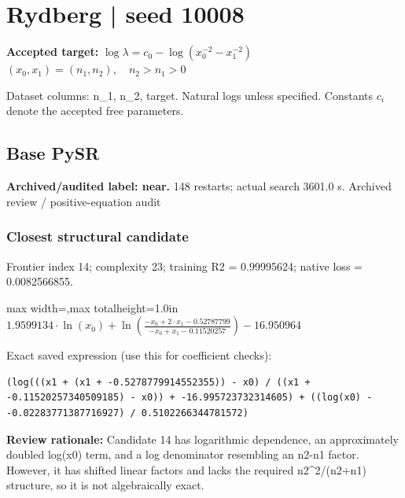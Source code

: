 \documentclass[10pt,letterpaper,landscape]{article}
\begin{document}
\section*{Rydberg | seed 10008}
\textbf{Accepted target:} $\displaystyle \log\lambda=c_0-\log\!\left(x_0^{-2}-x_1^{-2}\right)$\hfill $(x_0,x_1)=(n_1,n_2),\quad n_2>n_1>0$\par
{\small Dataset columns: n\_1, n\_2, target. Natural logs unless specified. Constants $c_i$ denote the accepted free parameters.}\par\medskip
\begin{minipage}[t]{0.485\textwidth}
\subsection*{Base PySR}
\textbf{Archived/audited label: near.} 148 restarts; actual search 3601.0 s.
{\small Archived review / positive-equation audit}
\subsubsection*{Closest structural candidate}
Frontier index 14; complexity 23; training R2 = 0.99995624; native loss = 0.0082566855.
\begin{center}\begin{adjustbox}{max width=\linewidth,max totalheight=1.0in}$\displaystyle 1.9599134 \cdot \ln{\left(x_{0} \right)} + \ln{\left(\frac{- x_{0} + 2 \cdot x_{1} - 0.52787799}{- x_{0} + x_{1} - 0.11520257} \right)} - 16.950964$\end{adjustbox}\end{center}
{\scriptsize Exact saved expression (use this for coefficient checks):}
\begin{lstlisting}
(log(((x1 + (x1 + -0.5278779914552355)) - x0) / ((x1 + -0.11520257340509185) - x0)) + -16.995723732314605) + ((log(x0) - -0.02283771387716927) / 0.5102266344781572)
\end{lstlisting}
{\small\textbf{Review rationale:} Candidate 14 has logarithmic dependence, an approximately doubled log(x0) term, and a log denominator resembling an n2-n1 factor. However, it has shifted linear factors and lacks the required n2\textasciicircum{}2/(n2+n1) structure, so it is not algebraically exact.}

\end{minipage}
\end{document}
